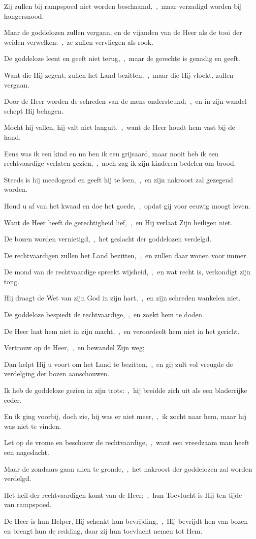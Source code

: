 \documentclass[12pt,twoside,a5paper]{article}
\begin{document}
\begin{halfparskip}
  Zij zullen bij rampspoed niet worden beschaamd,~\sep\ maar verzadigd worden bij hongersnood.

  Maar de goddelozen zullen vergaan, en de vijanden van de Heer als de tooi der weiden verwelken:~\sep\ ze zullen vervliegen als rook.

  De goddeloze leent en geeft niet terug,~\sep\ maar de gerechte is genadig en geeft.

  Want die Hij zegent, zullen het Land bezitten,~\sep\ maar die Hij vloekt, zullen vergaan.

  Door de Heer worden de schreden van de mens ondersteund;~\sep\ en in zijn wandel schept Hij behagen.

  Mocht hij vallen, hij valt niet languit,~\sep\ want de Heer houdt hem vast bij de hand,

  Eens was ik een kind en nu ben ik een grijsaard, maar nooit heb ik een rechtvaardige verlaten gezien,~\sep\ noch zag ik zijn kinderen bedelen om brood.

  Steeds is hij meedogend en geeft hij te leen,~\sep\ en zijn nakroost zal gezegend worden.

  Houd u af van het kwaad en doe het goede,~\sep\ opdat gij voor eeuwig moogt leven.

  Want de Heer heeft de gerechtigheid lief,~\sep\ en Hij verlaat Zijn heiligen niet.

  De bozen worden vernietigd,~\sep\ het geslacht der goddelozen verdelgd.

  De rechtvaardigen zullen het Land bezitten,~\sep\ en zullen daar wonen voor immer.

  De mond van de rechtvaardige spreekt wijsheid,~\sep\ en wat recht is, verkondigt zijn tong.

  Hij draagt de Wet van zijn God in zijn hart,~\sep\ en zijn schreden wankelen niet.

  De goddeloze bespiedt de rechtvaardige,~\sep\ en zoekt hem te doden.

  De Heer laat hem niet in zijn macht,~\sep\ en veroordeelt hem niet in het gericht.

  Vertrouw op de Heer,~\sep\ en bewandel Zijn weg;

  Dan helpt Hij u voort om het Land te bezitten,~\sep\ en gij zult vol vreugde de verdelging der bozen aanschouwen.

  Ik heb de goddeloze gezien in zijn trots:~\sep\ hij breidde zich uit als een bladerrijke ceder.

  En ik ging voorbij, doch zie, hij was er niet meer,~\sep\ ik zocht naar hem, maar hij was niet te vinden.

  Let op de vrome en beschouw de rechtvaardige,~\sep\ want een vreedzaam man heeft een nageslacht.

  Maar de zondaars gaan allen te gronde,~\sep\ het nakroost der goddelozen zal worden verdelgd.

  Het heil der rechtvaardigen komt van de Heer;~\sep\ hun Toevlucht is Hij ten tijde van rampspoed.

  De Heer is hun Helper, Hij schenkt hun bevrijding,~\sep\ Hij bevrijdt hen van bozen en brengt hun de redding, daar zij hun toevlucht nemen tot Hem.
\end{halfparskip}
\end{document}
